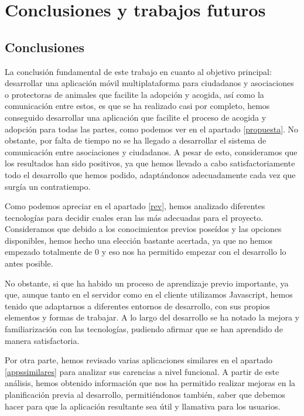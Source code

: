 \chapter{Conclusiones y trabajos futuros}

\section{Conclusiones}

La conclusión fundamental de este trabajo en cuanto al objetivo principal: desarrollar una aplicación móvil multiplataforma para ciudadanos y asociaciones o protectoras de animales que facilite la adopción y acogida, así como la comunicación entre estos, es que se ha realizado casi por completo, hemos conseguido desarrollar una aplicación que facilite el proceso de acogida y adopción para todas las partes, como podemos ver en el apartado \ref{propuesta}. No obstante, por falta de tiempo no se ha llegado a desarrollar el sistema de comunicación entre asociaciones y ciudadanos. A pesar de esto, consideramos que los resultados han sido positivos, ya que hemos llevado a cabo satisfactoriamente todo el desarrollo que hemos podido, adaptándonos adecuadamente cada vez que surgía un contratiempo.

Como podemos apreciar en el apartado \ref{rev}, hemos analizado diferentes tecnologías para decidir cuales eran las más adecuadas para el proyecto. Consideramos que debido a los conocimientos previos poseídos y las opciones disponibles, hemos hecho una elección bastante acertada, ya que no hemos empezado totalmente de 0 y eso nos ha permitido empezar con el desarrollo lo antes posible.

No obstante, si que ha habido un proceso de aprendizaje previo importante, ya que, aunque tanto en el servidor como en el cliente utilizamos Javascript, hemos tenido que adaptarnos a diferentes entornos de desarrollo, con sus propios elementos y formas de trabajar. A lo largo del desarrollo se ha notado la mejora y familiarización con las tecnologías, pudiendo afirmar que se han aprendido de manera satisfactoria.
 
Por otra parte, hemos revisado varias aplicaciones similares en el apartado \ref{appssimilares} para analizar sus carencias a nivel funcional. A partir de este análisis, hemos obtenido información que nos ha permitido realizar mejoras en la planificación previa al desarrollo, permitiéndonos también, saber que debemos hacer para que la aplicación resultante sea útil y llamativa para los usuarios.

